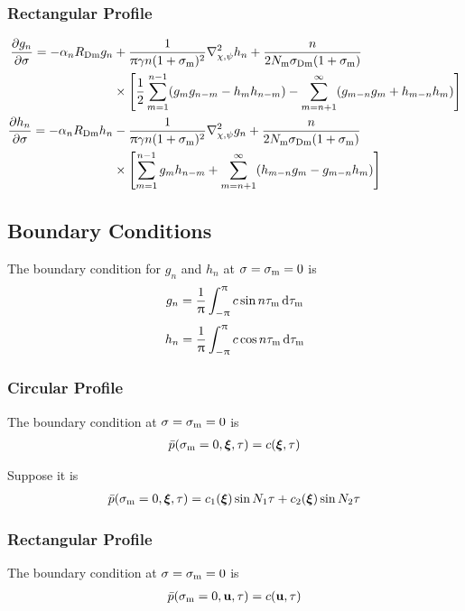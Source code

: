\documentclass{article}
\begin{document}
\subsubsection{Rectangular Profile}
\begin{align}
	\pdv{g_n}{\sigma} = - \alpha_n R\st{Dm} g_n &+
	\frac{1}{\uppi \gamma n(1+\sigma\st{m})^2} \laplacian_{\chi,\psi} h_n 
	+ \frac{n}{2N\st{m}\sigma\st{Dm}(1+\sigma\st{m})}\nonumber \\
	&\times \qty[\frac12 \sum_{m=1}^{n-1} (g_m g_{n-m} - h_m h_{n-m}) - \sum_{m=n+1}^\infty (g_{m-n}g_m+h_{m-n}h_m) ]\label{eq:gn_pdv_rect}\\
	\pdv{h_n}{\sigma} = - \alpha_n R\st{Dm} h_n &- \frac{1}{\uppi \gamma n(1+\sigma\st{m})^2} \laplacian_{\chi,\psi} g_n
	+ \frac{n}{2N\st{m}\sigma\st{Dm}(1+\sigma\st{m})} \nonumber \\
	&\times \qty[\sum_{m=1}^{n-1} g_m h_{n-m} + \sum_{m=n+1}^\infty (h_{m-n}g_m-g_{m-n}h_m) ]\label{eq:hn_pdv_rect}
\end{align}

\subsection{Boundary Conditions}
The boundary condition for $g_n$ and $h_n$ at $\sigma = \sigma_\text{m}=0$ is 
$$
g_n = \frac1\uppi \int_{-\uppi}^\uppi c \sin n\tau_\text{m} \dd{\tau_\text{m}}$$
$$
h_n = \frac1\uppi \int_{-\uppi}^\uppi c \cos n\tau_\text{m} \dd{\tau_\text{m}}$$

\subsubsection{Circular Profile}
The boundary condition at $\sigma=\sigma_\text{m}=0$ is 
\begin{align}
	\bar{p} (\sigma_\text{m}=0, \bm{\xi},\tau) = c(\bm{\xi}, \tau)
\end{align}

Suppose it is 
\begin{align}
	\bar{p} (\sigma_\text{m} =0,\bm{\xi}, \tau) = c_1(\bm{\xi}) \sin N_1 \tau
	+c_2(\bm{\xi}) \sin N_2\tau
\end{align}

\subsubsection{Rectangular Profile}
The boundary condition at $\sigma=\sigma_\text{m}=0$ is 
\begin{align}
	\bar{p} (\sigma_\text{m}=0, \vb{u},\tau) = c(\vb{u}, \tau)
\end{align}
\end{document}
